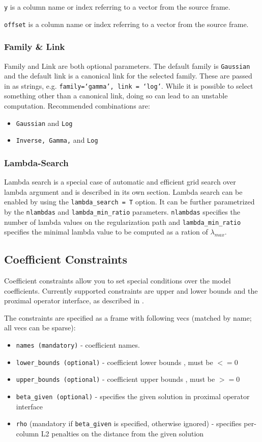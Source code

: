 \documentclass[11pt]{article}
\begin{document}
\texttt{y} is a column name or index referring to a vector from the source frame.

\texttt{offset} is a column name or index referring to a vector from the source frame.
  
\subsubsection{Family \& Link}
Family and Link are both optional parameters. The default family is \texttt{Gaussian} and the default link is a canonical link for the selected family. These are passed in as strings, e.g. \texttt{family=`gamma', link = `log'}.
While it is possible to select something other than a canonical link, doing so can lead to an unstable computation. Recommended combinations are: 
\begin{itemize}
\item \texttt{Gaussian} and \texttt{Log}
\item \texttt{Inverse, Gamma,} and \texttt{Log}
\end{itemize} 

\subsubsection{Lambda-Search}
Lambda search is a special case of automatic and efficient grid search over lambda argument and is described in its own section. Lambda search can be enabled by using the \texttt{lambda\_search = T} option. It can be further parametrized by the \texttt{nlambdas} and \texttt{lambda\_min\_ratio} parameters. 
\texttt{nlambdas} specifies the number of lambda values on the regularization path and \texttt{lambda\_min\_ratio} specifies the minimal lambda value to be computed as a ration of $\lambda_{max}$.

\subsection{Coefficient Constraints}
Coefficient constraints allow you to set special conditions over the model coefficients. Currently supported constraints are upper and lower bounds and the proximal operator interface, as described in .

The constraints are specified as a frame with following vecs (matched by name; all vecs can be sparse):
\begin{itemize}
\item \texttt{names (mandatory)}  - coefficient names. 
\item \texttt{lower\_bounds (optional)} - coefficient lower bounds , must be $<= 0$
\item \texttt{upper\_bounds (optional)} - coefficient upper bounds , must be $>= 0$
\item \texttt{beta\_given (optional)} - specifies the given solution in proximal operator interface
\item \texttt{rho} (mandatory if \texttt{beta\_given} is specified, otherwise ignored) - specifies per-column L2 penalties on the distance from the given solution
\end{itemize}
 
\end{document}

